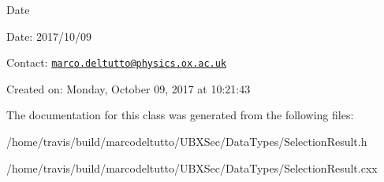 \begin{DoxyDate}{Date}

\end{DoxyDate}
\begin{DoxyParagraph}{Date\-:}
2017/10/09 
\end{DoxyParagraph}


Contact\-: \href{mailto:marco.deltutto@physics.ox.ac.uk}{\tt marco.\-deltutto@physics.\-ox.\-ac.\-uk}

Created on\-: Monday, October 09, 2017 at 10\-:21\-:43 

The documentation for this class was generated from the following files\-:\begin{DoxyCompactItemize}
\item 
/home/travis/build/marcodeltutto/\-U\-B\-X\-Sec/\-Data\-Types/Selection\-Result.\-h\item 
/home/travis/build/marcodeltutto/\-U\-B\-X\-Sec/\-Data\-Types/Selection\-Result.\-cxx\end{DoxyCompactItemize}
